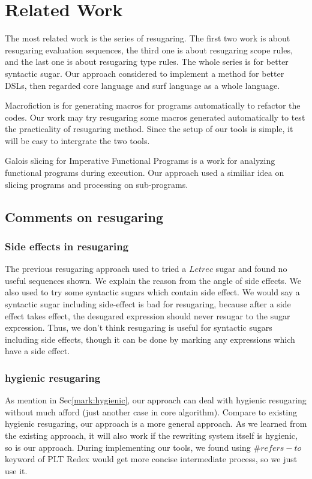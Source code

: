\section{Related Work}


The most related work is the series of resugaring\cite{resugaring,hygienic,resugaringtype,resugaringscope}. The first two work is about resugaring evaluation sequences, the third one is about resugaring scope rules, and the last one is about resugaring type rules. The whole series is for better syntactic sugar. Our approach considered to implement a method for better DSLs, then regarded core language and surf language as a whole language.

Macrofiction\cite{Macrofication} is for generating macros for programs automatically to refactor the codes. Our work may try resugaring some macros generated automatically to test the practicality of resugaring method. Since the setup of our tools is simple, it will be easy to intergrate the two tools.

Galois slicing for Imperative Functional Programs\cite{slicing} is a work for analyzing functional programs during execution. Our approach used a similiar idea on slicing programs and processing on sub-programs.

\subsection{Comments on resugaring}

\subsubsection{Side effects in resugaring}
\label{mark:side}
The previous resugaring approach used to tried a $Letrec$ sugar and found no useful sequences shown. We explain the reason from the angle of side effects. We also used to try some syntactic sugars which contain side effect. We would say a syntactic sugar including side-effect is bad for resugaring, because after a side effect takes effect, the desugared expression should never resugar to the sugar expression. Thus, we don't think resugaring is useful for syntactic sugars  including side effects, though it can be done by marking any expressions which have a side effect.

\subsubsection{hygienic resugaring}As mention in Sec\ref{mark:hygienic}, our approach can deal with hygienic resugaring without much afford (just another case in core algorithm). Compare to existing hygienic resugaring\cite{hygienic}, our approach is a more general approach. As we learned from the existing approach, it will also work if the rewriting system itself is hygienic, so is our approach. During implementing our tools, we found using $\#refers-to$ keyword of PLT Redex would get more concise intermediate process, so we just use it.